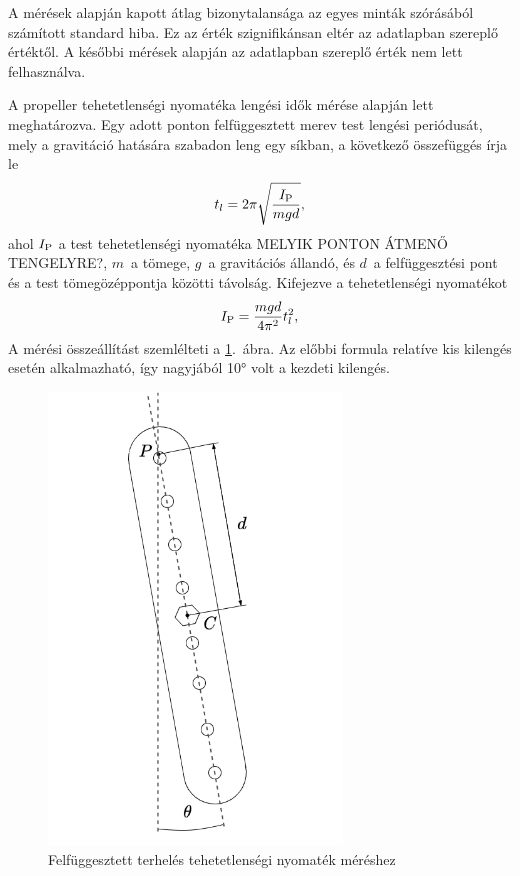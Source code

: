 A mérések alapján kapott átlag bizonytalansága az egyes minták szórásából számított 
standard hiba. Ez az érték szignifikánsan eltér az adatlapban szereplő értéktől. A 
későbbi mérések alapján az adatlapban szereplő érték nem lett felhasználva.

A propeller tehetetlenségi nyomatéka lengési idők mérése alapján lett meghatározva. Egy 
adott ponton felfüggesztett merev test lengési periódusát, mely a gravitáció hatására 
szabadon leng egy síkban, a következő összefüggés írja le
\begin{equation}
    t_l = 2\pi\sqrt{\frac{I_{\mathrm{P}}}{mgd}},
\end{equation}
ahol \(I_{\mathrm{P}}\) a test tehetetlenségi nyomatéka \alert{MELYIK PONTON ÁTMENŐ TENGELYRE?}, \(m\)~a tömege, \(g\)~a gravitációs állandó, 
és \(d\)~a felfüggesztési pont és a test tömegözéppontja közötti távolság. 
Kifejezve a tehetetlenségi nyomatékot 
\begin{equation}
    I_{\mathrm{P}} = \frac{mgd}{4\pi^2}t^2_l,
\end{equation}
A mérési összeállítást szemlélteti a \ref{fig:propeller_pendulum}.~ábra. Az 
előbbi formula relatíve kis kilengés esetén alkalmazható, így nagyjából 
10° volt a kezdeti kilengés.

\begin{figure}[t!]
    \begin{center}
    \includegraphics[height=12cm]{images/impedance_control_propeller.png}
    \caption{Felfüggesztett terhelés tehetetlenségi nyomaték méréshez}\label{fig:propeller_pendulum}
    \end{center}
\end{figure}

